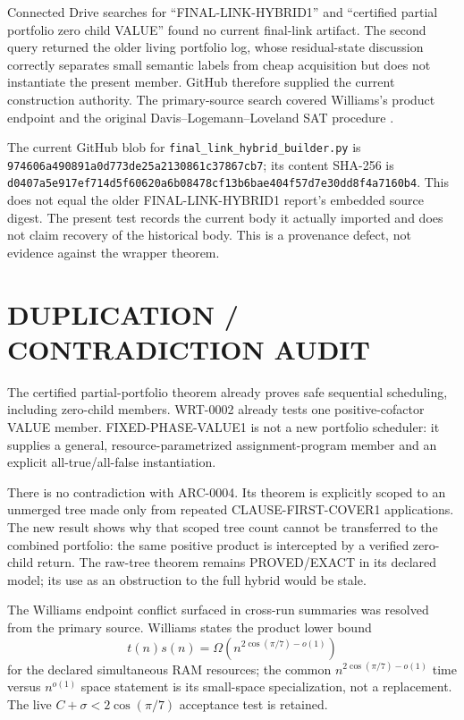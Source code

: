 \documentclass[11pt]{article}
\begin{document}
Connected Drive searches for ``FINAL-LINK-HYBRID1'' and ``certified partial
portfolio zero child VALUE'' found no current final-link artifact.  The
second query returned the older living portfolio log, whose residual-state
discussion correctly separates small semantic labels from cheap acquisition
but does not instantiate the present member.  GitHub therefore supplied the
current construction authority.  The primary-source search covered
Williams's product endpoint and the original Davis--Logemann--Loveland SAT
procedure \cite{williams2010,davis1962dpll}.

The current GitHub blob for
\texttt{final\_link\_hybrid\_builder.py} is
\texttt{974606a490891a0d773de25a2130861c37867cb7}; its content SHA-256 is
\texttt{d0407a5e917ef714d5f60620a6b08478cf13b6bae404f57d7e30dd8f4a7160b4}.
This does not equal the older FINAL-LINK-HYBRID1 report's embedded source
digest.  The present test records the current body it actually imported and
does not claim recovery of the historical body.  This is a provenance defect,
not evidence against the wrapper theorem.

\section{DUPLICATION / CONTRADICTION AUDIT}
The certified partial-portfolio theorem already proves safe sequential
scheduling, including zero-child members.  WRT-0002 already tests one
positive-cofactor VALUE member.  FIXED-PHASE-VALUE1 is not a new portfolio
scheduler: it supplies a general, resource-parametrized assignment-program
member and an explicit all-true/all-false instantiation.

There is no contradiction with ARC-0004.  Its theorem is explicitly scoped
to an unmerged tree made only from repeated CLAUSE-FIRST-COVER1 applications.
The new result shows why that scoped tree count cannot be transferred to the
combined portfolio: the same positive product is intercepted by a verified
zero-child return.  The raw-tree theorem remains PROVED/EXACT in its declared
model; its use as an obstruction to the full hybrid would be stale.

The Williams endpoint conflict surfaced in cross-run summaries was resolved
from the primary source.  Williams states the product lower bound
\[
 t(n)s(n)=\Omega\!\left(n^{2\cos(\pi/7)-o(1)}\right)
\]
for the declared simultaneous RAM resources; the common
$n^{2\cos(\pi/7)-o(1)}$ time versus $n^{o(1)}$ space statement is its
small-space specialization, not a replacement.  The live
$C+\sigma<2\cos(\pi/7)$ acceptance test is retained.
\end{document}
